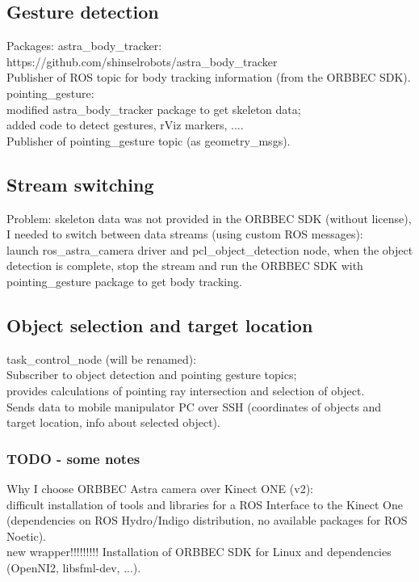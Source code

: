 \subsection{Gesture detection}
Packages: 
astra\_body\_tracker:\\
https://github.com/shinselrobots/astra\_body\_tracker\\
Publisher of ROS topic for body tracking information (from the ORBBEC SDK).\\

pointing\_gesture:\\
modified astra\_body\_tracker package to get skeleton data;\\
added code to detect gestures, rViz markers, ....\\

Publisher of pointing\_gesture topic (as geometry\_msgs).\\

\subsection{Stream switching}
Problem: skeleton data was not provided in the ORBBEC SDK (without license), I needed to switch between data streams (using custom ROS messages):\\
launch ros\_astra\_camera driver and pcl\_object\_detection node, when the object detection is complete, stop the stream and run the ORBBEC SDK with pointing\_gesture package to get body tracking.

\subsection{Object selection and target location}
task\_control\_node (will be renamed):\\
Subscriber to object detection and pointing gesture topics;\\
provides calculations of pointing ray intersection and selection of object.\\
Sends data to mobile manipulator PC over SSH (coordinates of objects and target location, info about selected object).\\

\subsubsection{TODO - some notes}
Why I choose ORBBEC Astra camera over Kinect ONE (v2):\\
difficult installation of tools and libraries for a ROS Interface to the Kinect One (dependencies on ROS Hydro/Indigo distribution, no available packages for ROS Noetic).\\
new wrapper!!!!!!!!!
Installation of ORBBEC SDK for Linux and dependencies (OpenNI2, libsfml-dev, ...).\\

